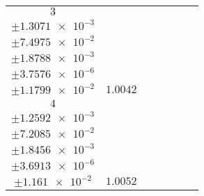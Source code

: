 \documentclass[8pt]{article}
\begin{document}
\begin{longtable}[l]{c c c c c c c}
$\num{3}$ & \begin{tabular}[c]{@{}c@{}}$\num{0.99902}$ \\ $\pm\num{1.3071e-3}$\end{tabular} & \begin{tabular}[c]{@{}c@{}}$\num{1.6175e-2}$ \\ $\pm\num{7.4975e-2}$\end{tabular} & \begin{tabular}[c]{@{}c@{}}$\num{2.257e+3}$ \\ $\pm\num{1.8788e-3}$\end{tabular} & \begin{tabular}[c]{@{}c@{}}$\num{4.514}$ \\ $\pm\num{3.7576e-6}$\end{tabular} & \begin{tabular}[c]{@{}c@{}}$\num{6.9856}$ \\ $\pm\num{1.1799e-2}$\end{tabular} & $\num{1.0042}$\\
$\num{4}$ & \begin{tabular}[c]{@{}c@{}}$\num{1.0004}$ \\ $\pm\num{1.2592e-3}$\end{tabular} & \begin{tabular}[c]{@{}c@{}}$\num{-0.10444}$ \\ $\pm\num{7.2085e-2}$\end{tabular} & \begin{tabular}[c]{@{}c@{}}$\num{2.2656e+3}$ \\ $\pm\num{1.8456e-3}$\end{tabular} & \begin{tabular}[c]{@{}c@{}}$\num{4.5312}$ \\ $\pm\num{3.6913e-6}$\end{tabular} & \begin{tabular}[c]{@{}c@{}}$\num{7.0057}$ \\ $\pm\num{1.161e-2}$\end{tabular} & $\num{1.0052}$\\
\bottomrule
\end{longtable}
\end{document}
